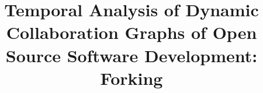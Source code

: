 \documentclass{acm_proc_article-sp}
\begin{document}
\title{Temporal Analysis of Dynamic Collaboration Graphs of Open Source Software Development: Forking}

%
%
%
%
%
\end{document}
